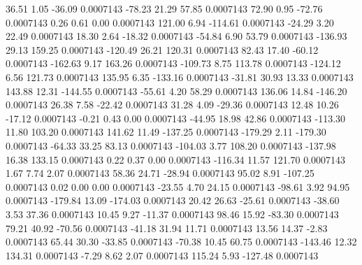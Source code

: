        36.51        1.05      -36.09     0.0007143
      -78.23       21.29       57.85     0.0007143
       72.90        0.95      -72.76     0.0007143
        0.26        0.61        0.00     0.0007143
      121.00        6.94     -114.61     0.0007143
      -24.29        3.20       22.49     0.0007143
       18.30        2.64      -18.32     0.0007143
      -54.84        6.90       53.79     0.0007143
     -136.93       29.13      159.25     0.0007143
     -120.49       26.21      120.31     0.0007143
       82.43       17.40      -60.12     0.0007143
     -162.63        9.17      163.26     0.0007143
     -109.73        8.75      113.78     0.0007143
     -124.12        6.56      121.73     0.0007143
      135.95        6.35     -133.16     0.0007143
      -31.81       30.93       13.33     0.0007143
      143.88       12.31     -144.55     0.0007143
      -55.61        4.20       58.29     0.0007143
      136.06       14.84     -146.20     0.0007143
       26.38        7.58      -22.42     0.0007143
       31.28        4.09      -29.36     0.0007143
       12.48       10.26      -17.12     0.0007143
       -0.21        0.43        0.00     0.0007143
      -44.95       18.98       42.86     0.0007143
     -113.30       11.80      103.20     0.0007143
      141.62       11.49     -137.25     0.0007143
     -179.29        2.11     -179.30     0.0007143
      -64.33       33.25       83.13     0.0007143
     -104.03        3.77      108.20     0.0007143
     -137.98       16.38      133.15     0.0007143
        0.22        0.37        0.00     0.0007143
     -116.34       11.57      121.70     0.0007143
        1.67        7.74        2.07     0.0007143
       58.36       24.71      -28.94     0.0007143
       95.02        8.91     -107.25     0.0007143
        0.02        0.00        0.00     0.0007143
      -23.55        4.70       24.15     0.0007143
      -98.61        3.92       94.95     0.0007143
     -179.84       13.09     -174.03     0.0007143
       20.42       26.63      -25.61     0.0007143
      -38.60        3.53       37.36     0.0007143
       10.45        9.27      -11.37     0.0007143
       98.46       15.92      -83.30     0.0007143
       79.21       40.92      -70.56     0.0007143
      -41.18       31.94       11.71     0.0007143
       13.56       14.37       -2.83     0.0007143
       65.44       30.30      -33.85     0.0007143
      -70.38       10.45       60.75     0.0007143
     -143.46       12.32      134.31     0.0007143
       -7.29        8.62        2.07     0.0007143
      115.24        5.93     -127.48     0.0007143
